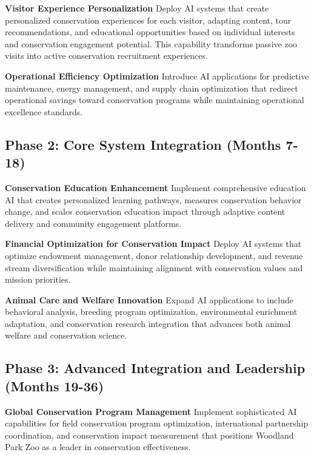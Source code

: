 \documentclass[
  Letterpaper,
]{scrbook}
\begin{document}
\textbf{Visitor Experience Personalization} Deploy AI systems that
create personalized conservation experiences for each visitor, adapting
content, tour recommendations, and educational opportunities based on
individual interests and conservation engagement potential. This
capability transforms passive zoo visits into active conservation
recruitment experiences.

\textbf{Operational Efficiency Optimization} Introduce AI applications
for predictive maintenance, energy management, and supply chain
optimization that redirect operational savings toward conservation
programs while maintaining operational excellence standards.

\subsection*{Phase 2: Core System Integration (Months
7-18)}\label{phase-2-core-system-integration-months-7-18}

\textbf{Conservation Education Enhancement} Implement comprehensive
education AI that creates personalized learning pathways, measures
conservation behavior change, and scales conservation education impact
through adaptive content delivery and community engagement platforms.

\textbf{Financial Optimization for Conservation Impact} Deploy AI
systems that optimize endowment management, donor relationship
development, and revenue stream diversification while maintaining
alignment with conservation values and mission priorities.

\textbf{Animal Care and Welfare Innovation} Expand AI applications to
include behavioral analysis, breeding program optimization,
environmental enrichment adaptation, and conservation research
integration that advances both animal welfare and conservation science.

\subsection*{Phase 3: Advanced Integration and Leadership (Months
19-36)}\label{phase-3-advanced-integration-and-leadership-months-19-36}

\textbf{Global Conservation Program Management} Implement sophisticated
AI capabilities for field conservation program optimization,
international partnership coordination, and conservation impact
measurement that positions Woodland Park Zoo as a leader in conservation
effectiveness.
\end{document}
